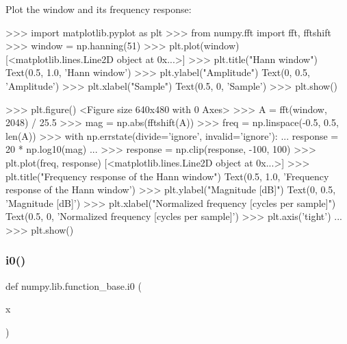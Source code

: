 \begin{DoxyVerb}
Plot the window and its frequency response:

>>> import matplotlib.pyplot as plt
>>> from numpy.fft import fft, fftshift
>>> window = np.hanning(51)
>>> plt.plot(window)
[<matplotlib.lines.Line2D object at 0x...>]
>>> plt.title("Hann window")
Text(0.5, 1.0, 'Hann window')
>>> plt.ylabel("Amplitude")
Text(0, 0.5, 'Amplitude')
>>> plt.xlabel("Sample")
Text(0.5, 0, 'Sample')
>>> plt.show()

>>> plt.figure()
<Figure size 640x480 with 0 Axes>
>>> A = fft(window, 2048) / 25.5
>>> mag = np.abs(fftshift(A))
>>> freq = np.linspace(-0.5, 0.5, len(A))
>>> with np.errstate(divide='ignore', invalid='ignore'):
...     response = 20 * np.log10(mag)
...
>>> response = np.clip(response, -100, 100)
>>> plt.plot(freq, response)
[<matplotlib.lines.Line2D object at 0x...>]
>>> plt.title("Frequency response of the Hann window")
Text(0.5, 1.0, 'Frequency response of the Hann window')
>>> plt.ylabel("Magnitude [dB]")
Text(0, 0.5, 'Magnitude [dB]')
>>> plt.xlabel("Normalized frequency [cycles per sample]")
Text(0.5, 0, 'Normalized frequency [cycles per sample]')
>>> plt.axis('tight')
...
>>> plt.show()\end{DoxyVerb}
 \mbox{\label{namespacenumpy_1_1lib_1_1function__base_accd5688c3b4cd85fab84aa78e4d07d55}} 
\subsubsection{\texorpdfstring{i0()}{i0()}}
{\footnotesize\ttfamily def numpy.\+lib.\+function\+\_\+base.\+i0 (\begin{DoxyParamCaption}\item[{}]{x }\end{DoxyParamCaption})}

